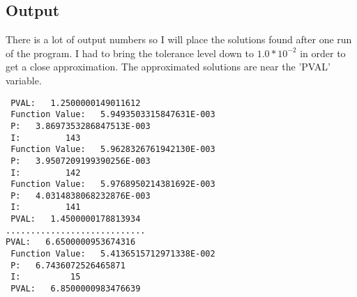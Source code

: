\documentclass[12pt]{article}
\begin{document}
 \subsection{Output}
 There is a lot of output numbers so I will place the solutions found after one run of the program. I had to bring the tolerance level down to $1.0*10^{-2}$ in order to get a close approximation. The approximated solutions are near the 'PVAL' variable. 
\begin{lstlisting} 
 PVAL:   1.2500000149011612     
 Function Value:   5.9493503315847631E-003
 P:   3.8697353286847513E-003
 I:         143
 Function Value:   5.9628326761942130E-003
 P:   3.9507209199390256E-003
 I:         142
 Function Value:   5.9768950214381692E-003
 P:   4.0314838068232876E-003
 I:         141
 PVAL:   1.4500000178813934     
............................
PVAL:   6.6500000953674316     
 Function Value:   5.4136515712971338E-002
 P:   6.7436072526465871     
 I:          15
 PVAL:   6.8500000983476639   
\end{lstlisting}
\end{document}
